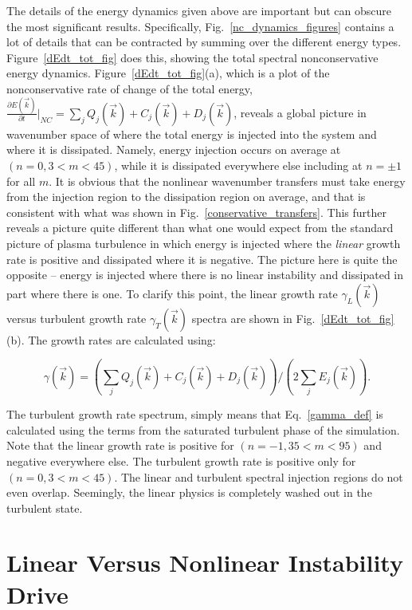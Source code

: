 \documentclass[showpacs,preprintnumbers,amsmath,amssymb,superscriptaddress,aip]{revtex4-1}
\def\beq{\begin{equation}}
\def\eeq{\end{equation}}
\newcommand{\pdiff}[2]{\frac{\partial#1}{\partial#2}}
\begin{document}
The details of the energy dynamics given above are important but can obscure the most significant results. Specifically, Fig.~\ref{nc_dynamics_figures} contains a lot of details
that can be contracted by summing over the different energy types.
Figure~\ref{dEdt_tot_fig} does this, showing the total spectral nonconservative energy dynamics.
Figure~\ref{dEdt_tot_fig}(a), which is a plot of the nonconservative rate of change of the total energy, $ \pdiff{E(\vec{k})}{t} \big|_{NC} = \sum_j Q_j(\vec{k}) + C_j(\vec{k}) + D_j(\vec{k})$, 
reveals a global picture in wavenumber space of
where the total energy is injected into the system and where it is dissipated. Namely, energy injection occurs on average at $(n=0, 3<m<45)$, 
while it is dissipated everywhere else including at $n=\pm 1$ for all $m$. It is obvious that the nonlinear wavenumber transfers must take energy from the injection region to the dissipation
region on average, and that is consistent with what was shown in Fig.~\ref{conservative_transfers}.
This further reveals a picture quite different than what one would expect from the standard picture of plasma turbulence in which energy is 
injected where the \emph{linear} growth rate is positive and dissipated
where it is negative. The picture here is quite the opposite -- energy is injected where there is no linear instability and dissipated in part where there is one.
To clarify this point, the linear growth rate $\gamma_L(\vec{k})$ versus turbulent growth rate $\gamma_{T}(\vec{k})$ spectra are shown in Fig.~\ref{dEdt_tot_fig}(b). 
The growth rates are calculated using:

\beq
\label{gamma_def}
\gamma(\vec{k}) = \left( \sum_j Q_j(\vec{k}) + C_j(\vec{k}) + D_j(\vec{k}) \right)/\left( 2 \sum_j E_j(\vec{k}) \right).
\eeq

The turbulent growth rate spectrum, simply means that Eq.~\ref{gamma_def} is calculated using the terms from the saturated turbulent phase of the simulation.
Note that the linear growth rate is positive for $(n=-1, 35<m<95)$ and negative everywhere else. The turbulent growth rate is positive only
for $(n=0, 3<m<45)$. The linear and turbulent spectral injection regions do not even overlap. Seemingly, the linear physics is completely washed out in the turbulent state. 


\section{Linear Versus Nonlinear Instability Drive}
\end{document}
